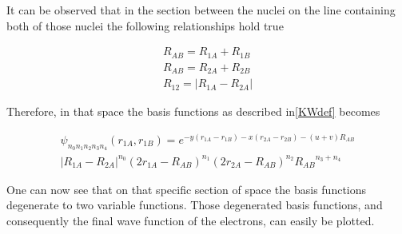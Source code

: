 \documentclass{pracalicmgr}
\begin{document}
It can be observed that in the section between the nuclei on the line containing both of those nuclei the following relationships hold true

\begin{align*} 
    R_{AB} = R_{1A}+R_{1B}\\
    R_{AB} = R_{2A}+R_{2B}\\
    R_{12} = \left| R_{1A} - R_{2A} \right|
\end{align*}

Therefore, in that space the basis functions as described in\ref{KWdef} becomes

\begin{multline}
    \psi_{n_0 n_1 n_2 n_3 n_4}\left(r_{1A},r_{1B}\right) = e^{-y\left(r_{1A}-r_{1B}\right)-x\left(r_{2A}-r_{2B}\right)-\left(u+v\right)R_{AB}}\\
    {\left| R_{1A} - R_{2A} \right|}^{n_0}{\left(2 r_{1A}-R_{AB}\right)}^{n_1}{\left(2 r_{2A}-R_{AB}\right)}^{n_2}{R_{AB}}^{n_3+n_4}
    \label{degen}
\end{multline}

One can now see that on that specific section of space the basis functions degenerate to two variable functions. Those degenerated basis functions, and consequently the final wave function of the electrons, can easily be plotted.
\end{document}
